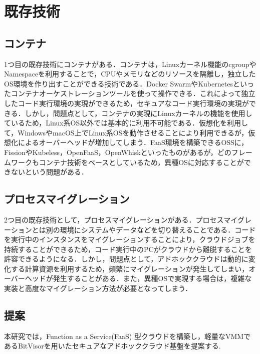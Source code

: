 \documentclass[11pt]{ujarticle} %
\begin{document}
\section{既存技術}
\subsection{コンテナ}
1つ目の既存技術にコンテナがある．コンテナは，Linuxカーネル機能のcgroupやNamespaceを利用することで，CPUやメモリなどのリソースを隔離し，独立したOS環境を作り出すことができる技術である．Docker SwarmやKubernetesといったコンテナオーケストレーションツールを使って操作できる．これによって独立したコード実行環境の実現ができるため，セキュアなコード実行環境の実現ができる．しかし，問題点として，コンテナの実現にLinuxカーネルの機能を使用しているため，Linux系OS以外では基本的に利用不可能である．仮想化を利用して，WindowsやmacOS上でLinux系OSを動作させることにより利用できるが，仮想化によるオーバーヘッドが増加してしまう．FaaS環境を構築できるOSSに，FissionやKubeless，OpenFaaS，OpenWhiskといったものがあるが，どのフレームワークもコンテナ技術をベースとしているため，異種OSに対応することができないという問題がある．

\subsection{プロセスマイグレーション}
2つ目の既存技術として，プロセスマイグレーションがある．プロセスマイグレーションとは別の環境にシステムやデータなどを切り替えることである．コードを実行中のインスタンスをマイグレーションすることにより，クラウドジョブを持続することができるため，コード実行中のPCがクラウドから離脱することを許容できるようになる．しかし，問題点として，アドホッククラウドは動的に変化する計算資源を利用するため，頻繁にマイグレーションが発生してしまい，オーバーヘッドが発生することがある．また，異種OSで実現する場合は，複雑な実装と高度なマイグレーション方法が必要となってしまう．

\subsection{提案}
本研究では，Function as a Service(FaaS) 型クラウドを構築し，軽量なVMMであるBitVisorを用いたセキュアなアドホッククラウド基盤を提案する.
\end{document}
